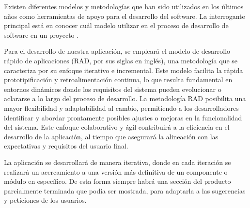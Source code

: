Existen diferentes modelos y metodologías que han sido utilizados en los últimos años como herramientas de apoyo para el desarrollo del software. La interrogante principal está en conocer cuál modelo utilizar en el proceso de desarrollo de software en un proyecto \cite{DELGADOOLIVERA2021}.

Para el desarrollo de nuestra aplicación, se empleará el modelo de desarrollo rápido de aplicaciones (RAD, por sus siglas en inglés), una metodología que se caracteriza por su enfoque iterativo e incremental. Este modelo facilita la rápida prototipificación y retroalimentación continua, lo que resulta fundamental en entornos dinámicos donde los requisitos del sistema pueden evolucionar o aclararse a lo largo del proceso de desarrollo. La metodología RAD posibilita una mayor flexibilidad y adaptabilidad al cambio, permitiendo a los desarrolladores identificar y abordar prontamente posibles ajustes o mejoras en la funcionalidad del sistema. Este enfoque colaborativo y ágil contribuirá a la eficiencia en el desarrollo de la aplicación, al tiempo que asegurará la alineación con las expectativas y requisitos del usuario final.

La aplicación se desarrollará de manera iterativa, donde en cada iteración se realizará un acercamiento a una versión más definitiva de un componente o módulo en específico. De esta forma siempre habrá una sección del producto parcialmente terminada que podía ser mostrada, para adaptarla a las sugerencias y peticiones de los usuarios.